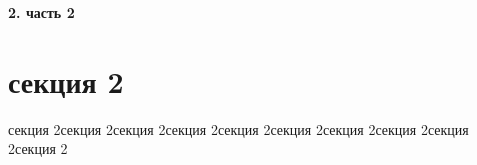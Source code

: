 \newpage
\begin{center}
  \textbf{\large 2. часть 2}
\end{center}


\section{секция 2}

секция 2секция 2секция 2секция 2секция 2секция 2секция 2секция 2секция 2секция 2
